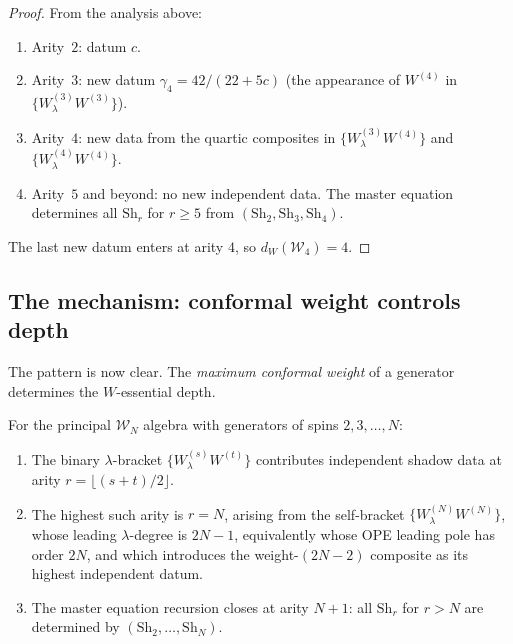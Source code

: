 \documentclass[11pt]{article}
\newcommand{\cW}{\mathcal{W}}
\begin{document}
\begin{proof}
From the analysis above:
\begin{enumerate}[label=\textup{(\roman*)},nosep]
\item Arity~$2$: datum $c$.
\item Arity~$3$: new datum $\gamma_4 = 42/(22{+}5c)$ (the
  appearance of $W^{(4)}$ in $\{W^{(3)}_\lambda W^{(3)}\}$).
\item Arity~$4$: new data from the quartic composites in
  $\{W^{(3)}_\lambda W^{(4)}\}$ and
  $\{W^{(4)}_\lambda W^{(4)}\}$.
\item Arity~$5$ and beyond: no new independent data.  The
  master equation determines all $\mathrm{Sh}_r$ for $r \ge 5$
  from $(\mathrm{Sh}_2, \mathrm{Sh}_3, \mathrm{Sh}_4)$.
\end{enumerate}
The last new datum enters at arity $4$, so $d_W(\cW_4) = 4$.
\end{proof}

\subsection*{The mechanism: conformal weight controls depth}

The pattern is now clear.  The \emph{maximum conformal weight}
of a generator determines the $W$-essential depth.

\begin{proposition}[Depth = maximum spin]
\label{prop:depth-equals-spin}
For the principal $\cW_N$ algebra with generators of spins
$2, 3, \ldots, N$:
\begin{enumerate}[label=\textup{(\roman*)}]
\item The binary $\lambda$-bracket $\{W^{(s)}_\lambda W^{(t)}\}$
  contributes independent shadow data at arity
  $r = \lfloor(s + t)/2\rfloor$.
\item The highest such arity is $r = N$, arising from the
  self-bracket $\{W^{(N)}_\lambda W^{(N)}\}$, whose leading
  $\lambda$-degree is $2N-1$, equivalently whose OPE leading pole
  has order $2N$, and which introduces the weight-$(2N-2)$
  composite as its highest independent datum.
\item The master equation recursion closes at arity $N + 1$:
  all $\mathrm{Sh}_r$ for $r > N$ are determined by
  $(\mathrm{Sh}_2, \ldots, \mathrm{Sh}_N)$.
\end{enumerate}
\end{proposition}
\end{document}
